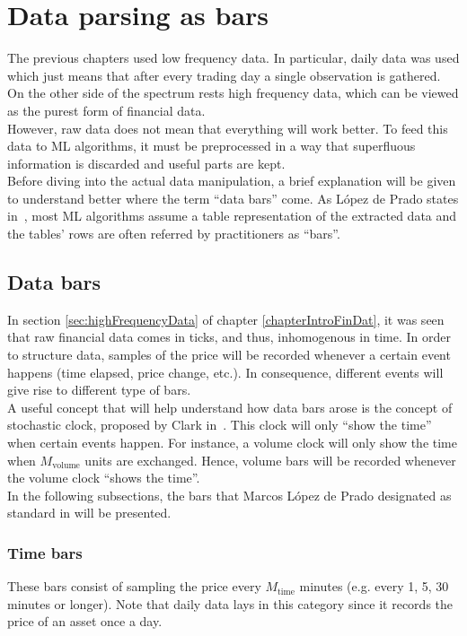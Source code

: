 \chapter{Data parsing as bars}
\label{chapterDataParsing}
The previous chapters used low frequency data. In particular, daily data was 
used which just means that after every trading day a single observation is 
gathered. On the other side of the spectrum rests high frequency data, which 
can be viewed as the purest form of financial data.\\

However, raw data does not mean that everything will work better. To feed 
this data to ML algorithms, it must be preprocessed in a way that 
superfluous information is discarded and useful parts are kept.\\

Before diving into the actual data manipulation, a brief explanation will be 
given to understand better where the term ``data bars'' come. As López de 
Prado states in~\cite{AdvFML}, most ML algorithms assume a table 
representation of the extracted data and the tables' rows are often referred 
by practitioners as ``bars''.

\section{Data bars}
In section \ref{sec:highFrequencyData} of chapter \ref{chapterIntroFinDat}, 
it was seen that raw financial data comes in ticks, and thus, inhomogenous 
in time. In order to structure data, samples of the price will be recorded 
whenever a certain event happens (time elapsed, price change, etc.). In 
consequence, different events will give rise to different type of bars.\\

A useful concept that will help understand how data bars arose is the 
concept of stochastic clock, proposed by Clark 
in~\cite{clark1973subordinated}. This clock will only ``show the time'' when 
certain events happen. For instance, a volume clock will only show the time 
when $M_{\text{volume}}$ units are exchanged. Hence, volume bars will be 
recorded whenever the volume clock ``shows the time''.\\

In the following subsections, the bars that Marcos López de Prado designated 
as standard in \cite{AdvFML} will be presented. 

\subsection*{Time bars}
These bars consist of sampling the price every $M_{\text{time}}$ minutes 
(e.g. every 1, 5, 30 minutes or longer). Note that daily data lays in this 
category since it records the price of an asset once a day.\\

